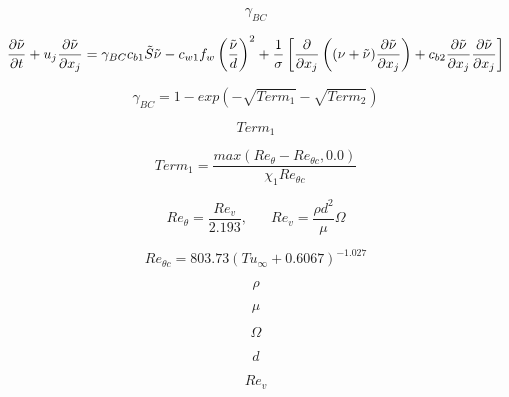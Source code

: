 

\begin{equation}
\gamma_{BC}
\end{equation}

\begin{equation}
\frac{\partial \tilde{\nu}}{\partial t}+ u_j \frac{\partial \tilde{\nu}}{\partial x_j} = \boldmath{\gamma_{BC}} c_{b1} \tilde{S} \tilde{\nu} 
- c_{w1} f_w \left(\frac{\tilde{\nu}}{d}\right)^2 
+ \frac{1}{\sigma} \left[ \frac{\partial}{\partial x_j} \left( (\nu + \tilde{\nu}) \frac{\partial \tilde{\nu}}{\partial x_j} \right) 
+ c_{b2} \frac{\partial \tilde{\nu}}{\partial x_j} \frac{\partial \tilde{\nu}}{\partial x_j} \right]
\end{equation}

\begin{equation}
\gamma_{BC} = 1-exp(-\sqrt{Term_1}-\sqrt{Term_2})
\end{equation}

\begin{equation}
Term_1
\end{equation}

\begin{equation}
Term_1 = \frac{max(Re_{\theta} - Re_{\theta c}, 0.0)}{\chi_1 Re_{\theta c}}
\end{equation}

\begin{equation}
Re_{\theta} = \frac{Re_v}{2.193}, \phantom{XX} Re_v = \frac{\rho {d}^2}{\mu} \Omega
\end{equation}

\begin{equation}
Re_{\theta c} = 803.73 {(Tu_\infty + 0.6067)}^{-1.027}
\end{equation}

\begin{equation}
\rho
\end{equation}

\begin{equation}
\mu
\end{equation}

\begin{equation}
\Omega
\end{equation}

\begin{equation}
d
\end{equation}

\begin{equation}
Re_v
\end{equation}

